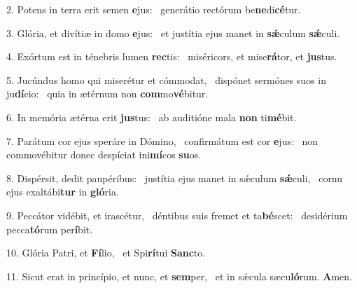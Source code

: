 2. Potens in terra erit semen \textbf{e}jus: \ast\  generátio rectórum be\textbf{ne}di\textbf{cé}tur.\

3. Glória, et divítiæ in domo \textbf{e}jus: \ast\  et justítia ejus manet in \textbf{sǽ}culum \textbf{sǽ}culi.\

4. Exórtum est in ténebris lumen \textbf{rec}tis: \ast\  miséricors, et mise\textbf{rá}tor, et \textbf{jus}tus.\

5. Jucúndus homo qui miserétur et cómmodat, \dag\  dispónet sermónes suos in ju\textbf{dí}cio: \ast\  quia in ætérnum non \textbf{com}mo\textbf{vé}bitur.\

6. In memória ætérna erit \textbf{jus}tus: \ast\  ab auditióne mala \textbf{non} ti\textbf{mé}bit.\

7. Parátum cor ejus speráre in Dómino, \dag\  confirmátum est cor \textbf{e}jus: \ast\  non commovébitur donec despíciat ini\textbf{mí}cos \textbf{su}os.\

8. Dispérsit, dedit paupéribus: \dag\  justítia ejus manet in sǽculum \textbf{sǽ}culi, \ast\  cornu ejus exaltábi\textbf{tur} in \textbf{gló}ria.\

9. Peccátor vidébit, et irascétur, \dag\  déntibus suis fremet et ta\textbf{bé}scet: \ast\  desidérium pecca\textbf{tó}rum per\textbf{í}bit.\

10. Glória Patri, et \textbf{Fí}lio, \ast\  et Spi\textbf{rí}tui \textbf{Sanc}to.\

11. Sicut erat in princípio, et nunc, et \textbf{sem}per, \ast\  et in sǽcula sæcu\textbf{ló}rum. \textbf{A}men.\

